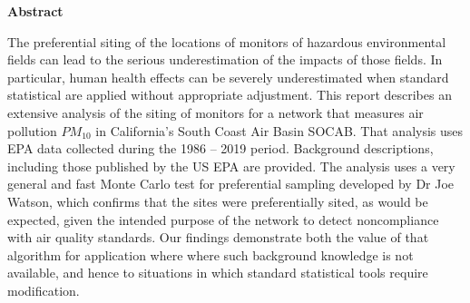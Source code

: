 \begin{center}
    \textbf{Abstract}
\end{center}
The preferential siting of the locations of monitors of hazardous environmental fields can lead to the serious underestimation of the impacts of those fields. In particular, human health effects can be severely underestimated when standard statistical are applied without appropriate adjustment.  This report describes an extensive analysis of the siting of monitors for a network that measures air pollution $PM_{10}$ in California's South Coast Air Basin SOCAB. That analysis uses EPA data collected during the 1986 -- 2019 period. Background descriptions, including those published by the US EPA are provided. The analysis uses a very general and fast Monte Carlo test for preferential sampling developed by Dr Joe Watson, which confirms that the sites were preferentially sited, as would be expected, given the intended purpose of the network to detect noncompliance with air quality standards. Our findings demonstrate both the value of that algorithm for application where  where such background knowledge is not available, and hence to situations in which standard statistical tools require modification.

 